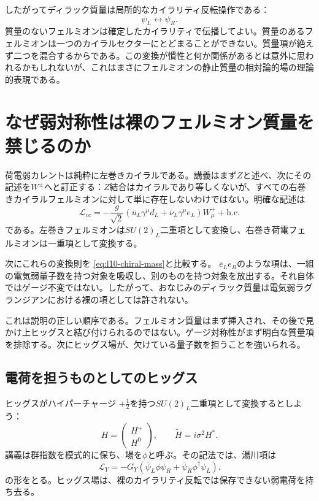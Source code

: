 したがってディラック質量は局所的なカイラリティ反転操作である：
\begin{equation}
  \psi_L\longleftrightarrow\psi_R .
\end{equation}
質量のないフェルミオンは確定したカイラリティで伝播してよい。質量のあるフェルミオンは一つのカイラルセクターにとどまることができない。質量項が絶えず二つを混合するからである。この変換が慣性と何か関係があるとは意外に思われるかもしれないが、これはまさにフェルミオンの静止質量の相対論的場の理論的表現である。

\section{なぜ弱対称性は裸のフェルミオン質量を禁じるのか}

荷電弱カレントは純粋に左巻きカイラルである。講義はまず\(Z\)と述べ、次にその記述を\(W^\pm\)へと訂正する：\(Z\)結合はカイラルであり等しくないが、すべての右巻きカイラルフェルミオンに対して単に存在しないわけではない。明確な記述は
\begin{equation}
  \mathcal L_{\mathrm{cc}}
  =
  -\frac{g}{\sqrt2}
  \left(\bar u_L\gamma^\mu d_L
  +\bar\nu_L\gamma^\mu e_L\right)W^+_\mu
  +\mathrm{h.c.}
  \label{eq:l10-charged-current}
\end{equation}
である。左巻きフェルミオンは\(SU(2)_L\)二重項として変換し、右巻き荷電フェルミオンは一重項として変換する。

次にこれらの変換則を
\eqref{eq:l10-chiral-mass}と比較する。
\(\bar e_L e_R\)のような項は、一組の電気弱量子数を持つ対象を吸収し、別のものを持つ対象を放出する。それ自体ではゲージ不変ではない。したがって、おなじみのディラック質量は電気弱ラグランジアンにおける裸の項としては許されない。

これは説明の正しい順序である。フェルミオン質量はまず挿入され、その後で見かけ上ヒッグスと結び付けられるのではない。ゲージ対称性がまず明白な質量項を排除する。次にヒッグス場が、欠けている量子数を担うことを強いられる。

\subsection{電荷を担うものとしてのヒッグス}

ヒッグスがハイパーチャージ
\(+\tfrac12\)を持つ\(SU(2)_L\)二重項として変換するとしよう：
\begin{equation}
  H=
  \begin{pmatrix}
    H^+\\ H^0
  \end{pmatrix},
  \qquad
  \widetilde H=i\sigma^2H^* .
  \label{eq:l10-higgs-doublet}
\end{equation}
講義は群指数を模式的に保ち、場を\(\phi\)と呼ぶ。その記法では、湯川項は
\begin{equation}
  \mathcal L_Y
  =
  -G_Y\left(
    \bar\psi_L\phi\psi_R+
    \bar\psi_R\phi^\dagger\psi_L
  \right).
  \label{eq:l10-yukawa-schematic}
\end{equation}
の形をとる。ヒッグス場は、裸のカイラリティ反転では保存できない弱電荷を持ち去る。

